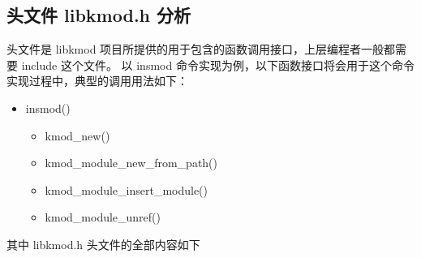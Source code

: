 \subsection{头文件 libkmod.h 分析}

头文件是 libkmod 项目所提供的用于包含的函数调用接口，上层编程者一般都需要
include 这个文件。 以 insmod
命令实现为例，以下函数接口将会用于这个命令实现过程中，典型的调用用法如下：

\begin{itemize}
\item
  insmod()
  \begin{itemize}
  \item
    kmod\_new()
  \item
    kmod\_module\_new\_from\_path()
  \item
    kmod\_module\_insert\_module()
  \item
    kmod\_module\_unref()
  \end{itemize}
\end{itemize}
其中 libkmod.h 头文件的全部内容如下

